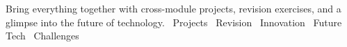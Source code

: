   {Bring everything together with cross-module projects, revision exercises, and a glimpse into the future of technology.}
  {\faProjectDiagram\ Projects \quad \faSync\ Revision \quad \faLightbulb\ Innovation \quad \faRocket\ Future Tech \quad \faTrophy\ Challenges}
